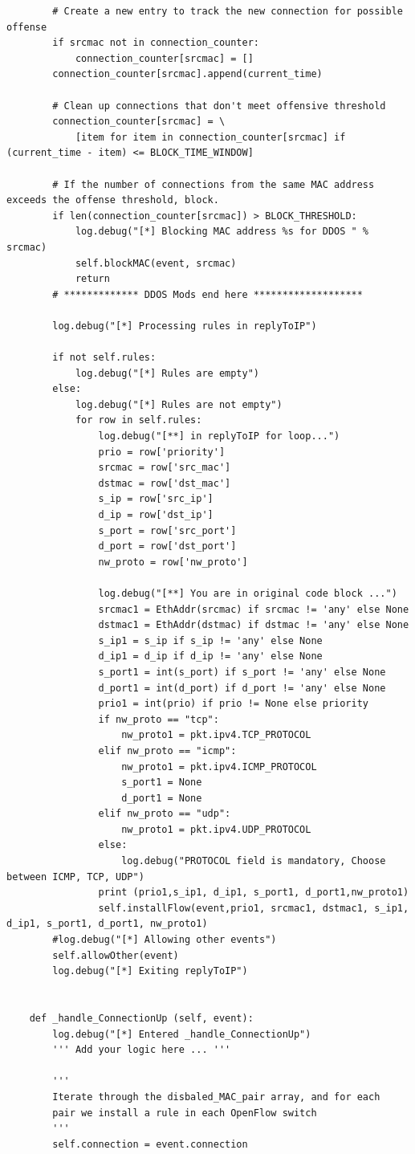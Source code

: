 \begin{verbatim}
		# Create a new entry to track the new connection for possible offense
		if srcmac not in connection_counter:
			connection_counter[srcmac] = []
		connection_counter[srcmac].append(current_time)

		# Clean up connections that don't meet offensive threshold		
		connection_counter[srcmac] = \
			[item for item in connection_counter[srcmac] if (current_time - item) <= BLOCK_TIME_WINDOW]

		# If the number of connections from the same MAC address exceeds the offense threshold, block.
		if len(connection_counter[srcmac]) > BLOCK_THRESHOLD:
			log.debug("[*] Blocking MAC address %s for DDOS " % srcmac)
			self.blockMAC(event, srcmac)
			return
		# ************* DDOS Mods end here *******************

		log.debug("[*] Processing rules in replyToIP")

		if not self.rules:
			log.debug("[*] Rules are empty")
		else:
			log.debug("[*] Rules are not empty")	
			for row in self.rules:
				log.debug("[**] in replyToIP for loop...")
				prio = row['priority']
				srcmac = row['src_mac']
				dstmac = row['dst_mac']
				s_ip = row['src_ip']
				d_ip = row['dst_ip']
				s_port = row['src_port']
				d_port = row['dst_port']
				nw_proto = row['nw_proto']
				
				log.debug("[**] You are in original code block ...")
				srcmac1 = EthAddr(srcmac) if srcmac != 'any' else None
				dstmac1 = EthAddr(dstmac) if dstmac != 'any' else None
				s_ip1 = s_ip if s_ip != 'any' else None
				d_ip1 = d_ip if d_ip != 'any' else None
				s_port1 = int(s_port) if s_port != 'any' else None
				d_port1 = int(d_port) if d_port != 'any' else None
				prio1 = int(prio) if prio != None else priority
				if nw_proto == "tcp":
					nw_proto1 = pkt.ipv4.TCP_PROTOCOL
				elif nw_proto == "icmp":
					nw_proto1 = pkt.ipv4.ICMP_PROTOCOL
					s_port1 = None
					d_port1 = None
				elif nw_proto == "udp":
					nw_proto1 = pkt.ipv4.UDP_PROTOCOL
				else:
					log.debug("PROTOCOL field is mandatory, Choose between ICMP, TCP, UDP")
				print (prio1,s_ip1, d_ip1, s_port1, d_port1,nw_proto1)
				self.installFlow(event,prio1, srcmac1, dstmac1, s_ip1, d_ip1, s_port1, d_port1, nw_proto1)
		#log.debug("[*] Allowing other events")		
		self.allowOther(event)
		log.debug("[*] Exiting replyToIP")


	def _handle_ConnectionUp (self, event):
		log.debug("[*] Entered _handle_ConnectionUp")		
		''' Add your logic here ... '''

		'''
		Iterate through the disbaled_MAC_pair array, and for each
		pair we install a rule in each OpenFlow switch
		'''
		self.connection = event.connection


\end{verbatim}
